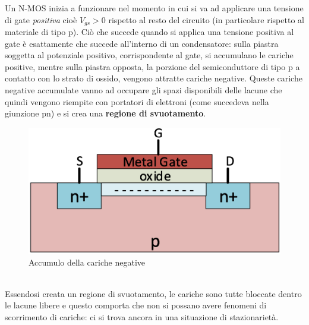 \documentclass[12pt, a4paper]{report}
\begin{document}
Un N-MOS inizia a funzionare nel momento in cui si va ad applicare una tensione di gate \textit{positiva} cioè $V_{gs} > 0$ rispetto al resto del circuito (in particolare rispetto al materiale di tipo p). Ciò che succede quando si applica una tensione positiva al gate è esattamente che succede all'interno di un condensatore: sulla piastra soggetta al potenziale positivo, corrispondente al gate, si accumulano le cariche positive, mentre sulla piastra opposta, la porzione del semiconduttore di tipo p a contatto con lo strato di ossido, vengono attratte cariche negative. Queste cariche negative accumulate vanno ad occupare gli spazi disponibili delle lacune che quindi vengono riempite con portatori di elettroni (come succedeva nella giunzione pn) e si crea una \textbf{regione di svuotamento}.
\begin{figure}[h]
    \centering
    \includegraphics[scale=0.4,angle=0]{n_mos_svuotamento.png}
    \caption{Accumulo della cariche negative}
\end{figure}
\\Essendosi creata un regione di svuotamento, le cariche sono tutte bloccate dentro le lacune libere e questo comporta che non si possano avere fenomeni di scorrimento di cariche: ci si trova ancora in una situazione di stazionarietà.
\end{document}
